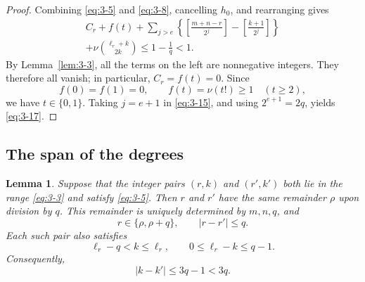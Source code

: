 \documentclass[11pt,a4paper]{article}
\numberwithin{equation}{section}
\newtheorem{lemma}[theorem]{Lemma}
\theoremstyle{definition}
\begin{document}
\begin{proof}
Combining \eqref{eq:3-5} and \eqref{eq:3-8}, cancelling $h_0$, and rearranging gives
\begin{equation}
\begin{aligned}
C_r+f(t)+\sum_{j>e}\left\{
\left[\frac{m+n-r}{2^j}\right]-\left[\frac{k+1}{2^j}\right]\right\}\\
+\nu\binom{\ell_r+k}{2k}\le1-\frac1q<1.
\end{aligned}
\label{eq:3-18}
\end{equation}
By Lemma~\ref{lem:3-3}, all the terms on the left are nonnegative integers. They therefore all vanish; in particular, $C_r=f(t)=0$. Since
\[
f(0)=f(1)=0,\qquad f(t)=\nu(t!)\ge1\quad(t\ge2),
\]
we have $t\in\{0,1\}$. Taking $j=e+1$ in \eqref{eq:3-15}, and using $2^{e+1}=2q$, yields \eqref{eq:3-17}.
\end{proof}

\subsection{The span of the degrees}

\begin{lemma}\label{lem:3-5}
Suppose that the integer pairs $(r,k)$ and $(r',k')$ both lie in the range \eqref{eq:3-3} and satisfy \eqref{eq:3-5}. Then $r$ and $r'$ have the same remainder $\rho$ upon division by $q$. This remainder is uniquely determined by $m,n,q$, and
\begin{equation}
r\in\{\rho,\rho+q\},\qquad |r-r'|\le q.
\label{eq:3-19}
\end{equation}
Each such pair also satisfies
\begin{equation}
\ell_r-q<k\le\ell_r,\qquad0\le\ell_r-k\le q-1.
\label{eq:3-20}
\end{equation}
Consequently,
\begin{equation}
|k-k'|\le3q-1<3q.
\label{eq:3-21}
\end{equation}
\end{lemma}
\end{document}
